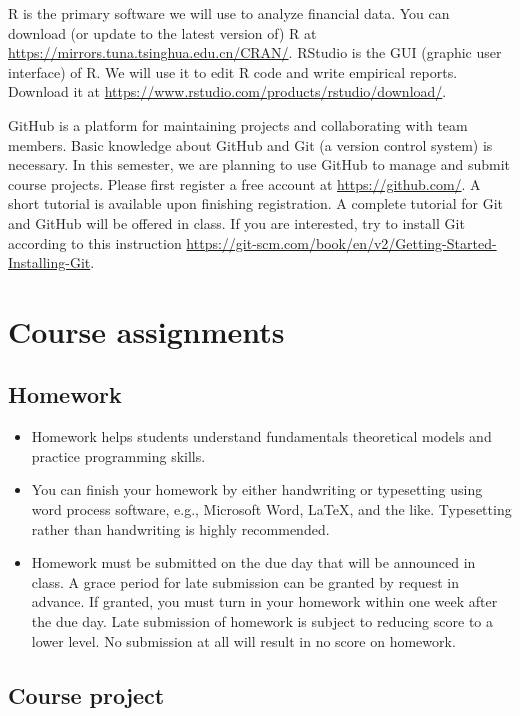 \documentclass[a4paper,11pt]{article}
\begin{document}
R is the primary software we will use to analyze financial data. You
can download (or update to the latest version of) R at
\url{https://mirrors.tuna.tsinghua.edu.cn/CRAN/}. RStudio is the GUI
(graphic user interface) of R. We will use it to edit R code and write
empirical reports. Download it at
\url{https://www.rstudio.com/products/rstudio/download/}.

GitHub is a platform for maintaining projects and collaborating with
team members. Basic knowledge about GitHub and Git (a version control
system) is necessary. In this semester, we are planning to use GitHub
to manage and submit course projects. Please first register a free
account at \url{https://github.com/}. A short tutorial is available upon
finishing registration. A complete tutorial for Git and GitHub will be
offered in class. If you are interested, try to install Git according to
this instruction
\url{https://git-scm.com/book/en/v2/Getting-Started-Installing-Git}.


\section{Course assignments}
\label{sec:orgb463e08}

\subsection*{Homework}
\label{sec:org61ef1d1}

\begin{itemize}
\item Homework helps students understand fundamentals
theoretical models and practice programming skills.

\item You can finish your homework by either handwriting or typesetting
using word process software, e.g., Microsoft Word, \LaTeX{}, and the
like. Typesetting rather than handwriting is highly recommended.

\item Homework must be submitted on the due day that will be announced in
class. A grace period for late submission can be granted by request
in advance. If granted, you must turn in your homework within one
week after the due day. Late submission of homework is subject to
reducing score to a lower level. No submission at all will result in
no score on homework.
\end{itemize}


\subsection*{Course project}
\label{sec:org1b14a6e}
\end{document}
